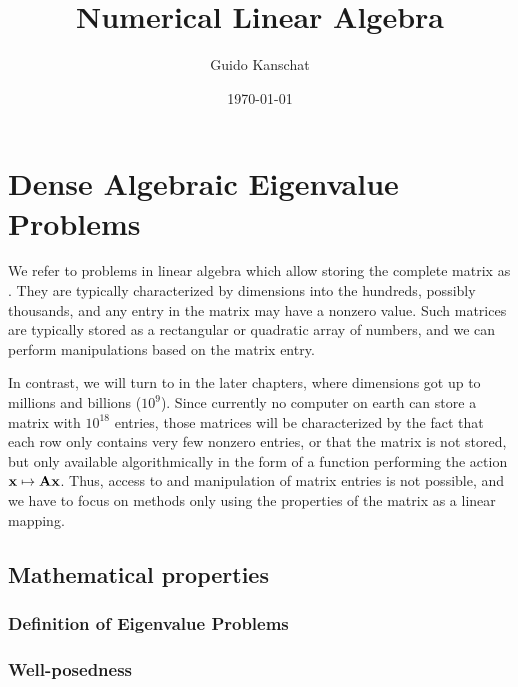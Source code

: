 \lstset{language=Python,numbers=left,resetmargins=true,xleftmargin=8pt,basicstyle=\small,numberstyle=\scriptsize}
\usetikzlibrary{svg.path}


\title{Numerical Linear Algebra}
\author{Guido Kanschat}
\date{\today}

\def\esp#1{V_{#1}}


\maketitle
\tableofcontents
\chapter{Dense Algebraic Eigenvalue Problems}
\begin{intro}
  We refer to problems in linear algebra which allow storing the
  complete matrix as . They are typically
  characterized by dimensions into the hundreds, possibly thousands,
  and any entry in the matrix may have a nonzero value. Such matrices
  are typically stored as a rectangular or quadratic array of numbers,
  and we can perform manipulations based on the matrix entry.

  In contrast, we will turn to  in the
  later chapters, where dimensions got up to millions and billions
  ($10^9$). Since currently no computer on earth can store a matrix
  with $10^{18}$ entries, those matrices will be characterized by the
  fact that each row only contains very few nonzero entries, or that
  the matrix is not stored, but only available algorithmically in the
  form of a function performing the action $\mathbf x\mapsto \mathbf A
  \mathbf x$. Thus, access to and manipulation of matrix entries is not
  possible, and we have to focus on methods only using the properties
  of the matrix as a linear mapping.
\end{intro}

\section{Mathematical properties}
\subsection{Definition of Eigenvalue Problems}

\subsection{Well-posedness}


